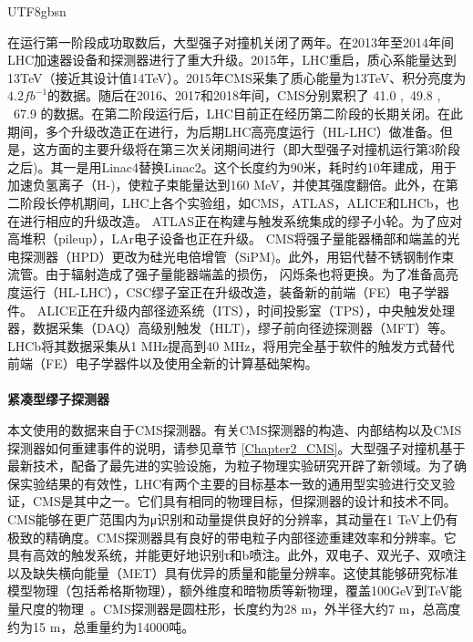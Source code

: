 \begin{CJK}{UTF8}{gbsn}
\par 在运行第一阶段成功取数后，大型强子对撞机关闭了两年。在2013年至2014年间LHC加速器设备和探测器进行了重大升级。2015年，LHC重启，质心系能量达到13TeV（接近其设计值14TeV）。2015年CMS采集了质心能量为13TeV、积分亮度为$4.2fb^{-1}$的数据。随后在2016、2017和2018年间，CMS分别累积了
41.0 \ifb,~49.8 \ifb, ~67.9 \ifb
	的数据。在第二阶段运行后，LHC目前正在经历第二阶段的长期关闭。在此期间，多个升级改造正在进行，为后期LHC高亮度运行（HL-LHC）做准备。但是，这方面的主要升级将在第三次关闭期间进行（即大型强子对撞机运行第3阶段之后)。其一是用Linac4替换Linac2。这个长度约为90米，耗时约10年建成，用于加速负氢离子（H-)，使粒子束能量达到160 MeV，并使其强度翻倍。此外，在第二阶段长停机期间，LHC上各个实验组，如CMS，ATLAS，ALICE和LHCb，也在进行相应的升级改造。
ATLAS正在构建与触发系统集成的缪子小轮。为了应对高堆积（pileup），LAr电子设备也正在升级。
	CMS将强子量能器桶部和端盖的光电探测器（HPD）更改为硅光电倍增管（SiPM)。此外，用铝代替不锈钢制作束流管。由于辐射造成了强子量能器端盖的损伤， 
闪烁条也将更换。为了准备高亮度运行（HL-LHC），CSC缪子室正在升级改造，装备新的前端（FE）电子学器件。
	ALICE正在升级内部径迹系统（ITS），时间投影室（TPS），中央触发处理器，数据采集（DAQ）高级别触发（HLT)，缪子前向径迹探测器（MFT）等。
LHCb将其数据采集从1 MHz提高到40 MHz，将用完全基于软件的触发方式替代前端（FE）电子学器件以及使用全新的计算基础架构。\\ \\
\textbf{\large{紧凑型缪子探测器}} %
\par 	本文使用的数据来自于CMS探测器。有关CMS探测器的构造、内部结构以及CMS探测器如何重建事件的说明，请参见章节 \ref{Chapter2_CMS}。大型强子对撞机基于最新技术，配备了最先进的实验设施，为粒子物理实验研究开辟了新领域。为了确保实验结果的有效性，LHC有两个主要的目标基本一致的通用型实验进行交叉验证，CMS是其中之一。它们具有相同的物理目标，但探测器的设计和技术不同。CMS能够在更广范围内为μ识别和动量提供良好的分辨率，其动量在1 TeV上仍有极致的精确度。CMS探测器具有良好的带电粒子内部径迹重建效率和分辨率。它具有高效的触发系统，并能更好地识别τ和b喷注。此外，双电子、双光子、双喷注以及缺失横向能量（MET）具有优异的质量和能量分辨率。这使其能够研究标准模型物理（包括希格斯物理），额外维度和暗物质等新物理，覆盖100GeV到TeV能量尺度的物理~\cite{Reference34}。CMS探测器是圆柱形，长度约为28 m，外半径大约7 m，总高度约为15 m，总重量约为14000吨。

\end{CJK}
